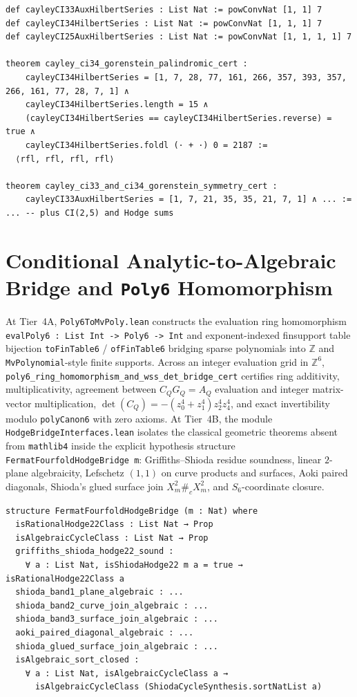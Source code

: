 \documentclass[11pt,a4paper]{article}
\begin{document}
\begin{lstlisting}[caption={Discrete Hilbert convolution and Gorenstein symmetry certificates in \texttt{CayleyCompleteInt.lean}.}]
def cayleyCI33AuxHilbertSeries : List Nat := powConvNat [1, 1] 7
def cayleyCI34HilbertSeries : List Nat := powConvNat [1, 1, 1] 7
def cayleyCI25AuxHilbertSeries : List Nat := powConvNat [1, 1, 1, 1] 7

theorem cayley_ci34_gorenstein_palindromic_cert :
    cayleyCI34HilbertSeries = [1, 7, 28, 77, 161, 266, 357, 393, 357, 266, 161, 77, 28, 7, 1] ∧
    cayleyCI34HilbertSeries.length = 15 ∧
    (cayleyCI34HilbertSeries == cayleyCI34HilbertSeries.reverse) = true ∧
    cayleyCI34HilbertSeries.foldl (· + ·) 0 = 2187 :=
  ⟨rfl, rfl, rfl, rfl⟩

theorem cayley_ci33_and_ci34_gorenstein_symmetry_cert :
    cayleyCI33AuxHilbertSeries = [1, 7, 21, 35, 35, 21, 7, 1] ∧ ... := ... -- plus CI(2,5) and Hodge sums
\end{lstlisting}

\section{Conditional Analytic-to-Algebraic Bridge and \texttt{Poly6} Homomorphism}

At Tier~4A, \texttt{Poly6ToMvPoly.lean} constructs the evaluation ring homomorphism \texttt{evalPoly6 : List Int -> Poly6 -> Int} and exponent-indexed finsupport table bijection \texttt{toFinTable6} / \texttt{ofFinTable6} bridging sparse polynomials into $\mathbb{Z}$ and \texttt{MvPolynomial}-style finite supports. Across an integer evaluation grid in $\mathbb{Z}^6$, \texttt{poly6\_ring\_homomorphism\_and\_wss\_det\_bridge\_cert} certifies ring additivity, multiplicativity, agreement between $C_Q G_Q = A_Q$ evaluation and integer matrix-vector multiplication, $\det(C_Q) = -(z_0^4 + z_1^4) z_2^4 z_4^4$, and exact invertibility modulo \texttt{polyCanon6} with zero axioms. At Tier~4B, the module \texttt{HodgeBridgeInterfaces.lean} isolates the classical geometric theorems absent from \texttt{mathlib4} inside the explicit hypothesis structure \texttt{FermatFourfoldHodgeBridge m}: Griffiths--Shioda residue soundness, linear $2$-plane algebraicity, Lefschetz $(1,1)$ on curve products and surfaces, Aoki paired diagonals, Shioda's glued surface join $X_m^2 \#_c X_m^2$, and $S_6$-coordinate closure.

\begin{lstlisting}[caption={Explicit classical analytic-to-algebraic bridge interface in \texttt{HodgeBridgeInterfaces.lean}.}]
structure FermatFourfoldHodgeBridge (m : Nat) where
  isRationalHodge22Class : List Nat → Prop
  isAlgebraicCycleClass : List Nat → Prop
  griffiths_shioda_hodge22_sound :
    ∀ a : List Nat, isShiodaHodge22 m a = true → isRationalHodge22Class a
  shioda_band1_plane_algebraic : ...
  shioda_band2_curve_join_algebraic : ...
  shioda_band3_surface_join_algebraic : ...
  aoki_paired_diagonal_algebraic : ...
  shioda_glued_surface_join_algebraic : ...
  isAlgebraic_sort_closed :
    ∀ a : List Nat, isAlgebraicCycleClass a →
      isAlgebraicCycleClass (ShiodaCycleSynthesis.sortNatList a)
\end{lstlisting}
\end{document}
